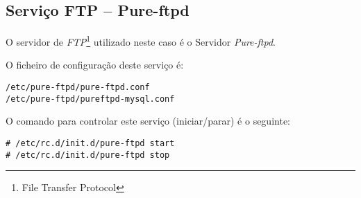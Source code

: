 \subsection{Serviço FTP -- Pure-ftpd}

O servidor de \emph{FTP}\footnote{File Transfer Protocol} utilizado neste caso é o Servidor \emph{Pure-ftpd}.

O ficheiro de configuração deste serviço é:

\begin{Verbatim}[commandchars=\\\{\}]
/etc/pure-ftpd/pure-ftpd.conf
/etc/pure-ftpd/pureftpd-mysql.conf
\end{Verbatim}

O comando para controlar este serviço (iniciar/parar) é o seguinte:

\begin{Verbatim}[commandchars=\\\{\}]
# /etc/rc.d/init.d/pure-ftpd start
# /etc/rc.d/init.d/pure-ftpd stop
\end{Verbatim}

